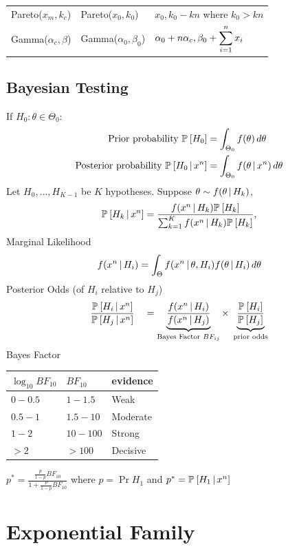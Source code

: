 \documentclass[landscape]{article}
\begin{document}
\begin{multicols*}{2}
\begin{tabular}{|l|p{}|p{}|}
  Pareto($x_m, k_c$) & Pareto($x_0, k_0$) &
  $\displaystyle x_0, k_0 - kn$ where $k_0 > kn$ \\

  Gamma($\alpha_c, \beta$) & Gamma($\alpha_0, \beta_0$) &
  $\displaystyle \alpha_0 + n\alpha_c, \beta_0 + \sum_{i=1}^n x_i$ \\[3ex]

  \hline
\end{tabular}

\subsection{Bayesian Testing}
If $H_0:\theta \in \Theta_0$:
\begin{align*}
  \text{Prior probability } \mathbb{P}_{}\left[H_0\right] &= \int_{\Theta_0} f(\theta)\,d\theta\\
  \text{Posterior probability } \mathbb{P}_{}\left[H_0\,|\, x^n\right] &= 
    \int_{\Theta_0} f(\theta\,|\, x^n)\,d\theta\\
\end{align*} 
Let $H_0,\ldots,H_{K-1}$ be $K$ hypotheses. Suppose
$\theta \sim f(\theta\,|\, H_k)$,
$$\mathbb{P}_{}\left[H_k\,|\, x^n\right] 
= \frac{f(x^n\,|\, H_k)\mathbb{P}_{}\left[H_k\right]}{\sum_{k=1}^K f(x^n\,|\, H_k)\mathbb{P}_{}\left[H_k\right]},$$
Marginal Likelihood
$$f(x^n\,|\, H_i) 
= \int_\Theta f(x^n\,|\, \theta,H_i)f(\theta\,|\, H_i) \,d\theta$$
Posterior Odds (of $H_i$ relative to $H_j$)
$$\frac{\Pr{H_i\giv x^n}}{\Pr{H_j\giv x^n}} \quad
= \underbrace{\frac{f(x^n\giv H_i)}{f(x^n\giv H_j)}}%
  _{\text{Bayes Factor }BF_{ij}} 
\times \;\underbrace{\frac{\Pr{H_i}}{\Pr{H_j}}}_{\text{prior odds}}$$
Bayes Factor

\centering
\begin{tabular}{lll}
  $\log_{10} BF_{10}$ & $BF_{10}$ & \textsf{evidence} \\
  \hline
  $0 - 0.5$ & $1 - 1.5$   & Weak \\
  $0.5 - 1$ & $1.5 - 10$  & Moderate \\
  $1 - 2$   & $10 - 100$  & Strong \\
  $> 2$     & $> 100$     & Decisive \\
\end{tabular}

$p^* = \displaystyle\frac{\frac{p}{1-p}BF_{10}}{1+\frac{p}{1-p}BF_{10}}$ where
$p=\Pr{H_1}$ and $p^* = \mathbb{P}_{}\left[H_1 \,|\, x^n\right]$

\raggedright

\section{Exponential Family}


\end{multicols*}
\end{document}
